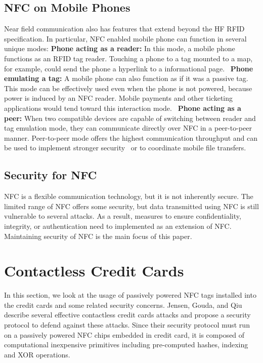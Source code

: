 \documentclass{sig-alternate}
\begin{document}
\subsection{NFC on Mobile Phones}
\label{sec:nfcOnPhones}
Near field communication also has features that extend beyond the HF RFID specification. In particular, NFC enabled mobile phone can function in several unique modes:
\vspace{2mm}\newline
\textbf{Phone acting as a reader:}
In this mode, a mobile phone functions as an RFID tag reader. Touching a phone to a tag mounted to a map, for example, could send the phone a hyperlink to a informational page.~\cite{staticDynamicDisplays} 
\vspace{2mm}\newline
\textbf{Phone emulating a tag:}
A mobile phone can also function as if it was a passive tag. This mode can be effectively used even when the phone is not powered, because power is induced by an NFC reader. Mobile payments and other ticketing applications would tend toward this interaction mode.~\cite{Gum2013}
\vspace{2mm}\newline
\textbf{Phone acting as a peer:}
When two compatible devices are capable of switching between reader and tag emulation mode, they can communicate directly over NFC in a peer-to-peer manner. Peer-to-peer mode offers the highest communication throughput and can be used to implement stronger security~\cite{Ticket2011} or to coordinate mobile file transfers.~\cite{Gum2013}

\subsection{Security for NFC}
\label{sec:backgroundSecurity}
NFC is a flexible communication technology, but it is not inherently secure. The limited range of NFC offers some security, but data transmitted using NFC is still vulnerable to several attacks. As a result, measures to ensure confidentiality, integrity, or authentication need to implemented as an extension of NFC. Maintaining security of NFC is the main focus of this paper.~\cite{CC2016}



\section{Contactless Credit Cards}
\label{sec:creditCard}
In this section, we look at the usage of passively powered NFC tags installed into the  credit cards and some related security concerns. Jensen, Gouda, and Qiu describe several effective contactless credit cards attacks and propose a security protocol to defend against these attacks. Since their security protocol must run on a passively powered NFC chips embedded in credit card, it is composed of computational inexpensive primitives including pre-computed hashes, indexing and XOR operations.~\cite{CC2016}
\end{document}
